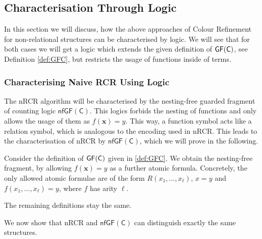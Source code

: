 \subsection{Characterisation Through Logic}
\label{sec:RCRwithFnLogic}

In this section we will discuss, how the above approaches of Colour Refinement for non-relational structures can be characterised by logic.
We will see that for both cases we will get a logic which extends the given definition of $\mathsf{GF}(\mathsf{C})$, see Definition \ref{def:GFC}, but restricts the usage of functions inside of terms.

\subsubsection{Characterising Naive RCR Using Logic} 

The nRCR algorithm will be characterised by the nesting-free guarded fragment of counting logic $\mathsf{nfGF}(\mathsf C)$.
This logics forbids the nesting of functions and only allows the usage of them as $f(\mathbf x)=y$.
This way, a function symbol acts like a relation symbol, which is analogous to the encoding used in nRCR. 
This leads to the characterisation of nRCR by $\mathsf{nfGF}(\mathsf C)$, which we will prove in the following.

\begin{definition}
	Consider the definition of $\mathsf{GF}(\mathsf{C})$ given in \ref{def:GFC}.
	We obtain the nesting-free fragment, by allowing $f(\mathbf x)=y$ as a further atomic formula.
	Concretely, the only allowed atomic formulae are of the form $R(x_1,\dots,x_\ell)$, $x=y$ and $f(x_1,\dots,x_\ell)=y$, where $f$ has arity $\ell$.
	
	The remaining definitions stay the same.
\end{definition}

We now show that nRCR and $\mathsf{nfGF}(\mathsf C)$ can distinguish exactly the same structures.

